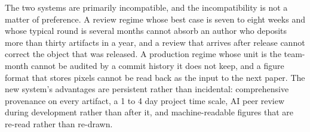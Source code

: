 The two systems are primarily incompatible, and the incompatibility is not a
matter of preference. A review regime whose best case is seven to eight weeks
and whose typical round is several months cannot absorb an author who deposits
more than thirty artifacts in a year, and a review that arrives after release
cannot correct the object that was released. A production regime whose unit is
the team-month cannot be audited by a commit history it does not keep, and a
figure format that stores pixels cannot be read back as the input to the next
paper. The new system's advantages are persistent rather than incidental:
comprehensive provenance on every artifact, a 1 to 4 day project time scale, AI
peer review during development rather than after it, and machine-readable
figures that are re-read rather than re-drawn.

